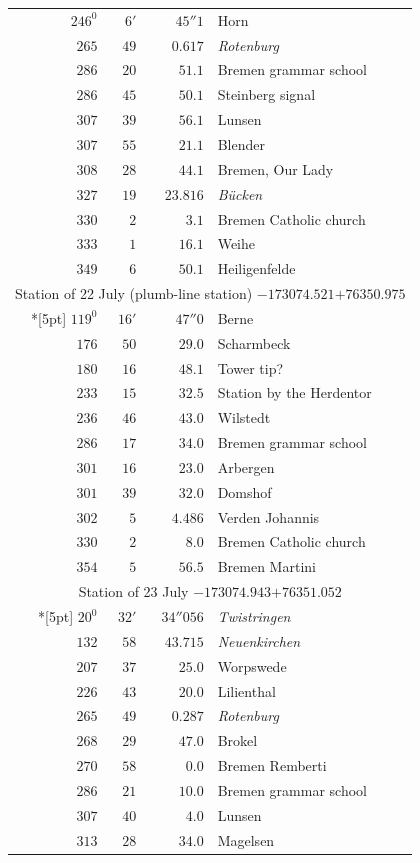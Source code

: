 \clearpage
{}%
\begingroup
\fontsize{10.5}{13}\selectfont
\setlength{\tabcolsep}{3pt}
\setlength{\LTpre}{2pt}
\setlength{\LTpost}{2pt}
\begin{longtable}{@{}rrrp{.61\linewidth}@{}}
\(246^{0}\)&\(6'\)&\(45''1\)&\raggedright Horn\tabularnewline
\(265\)&\(49\)&\(0.617\)&\raggedright \textit{Rotenburg}\tabularnewline
\(286\)&\(20\)&\(51.1\)&\raggedright Bremen grammar school\tabularnewline
\(286\)&\(45\)&\(50.1\)&\raggedright Steinberg signal\tabularnewline
\(307\)&\(39\)&\(56.1\)&\raggedright Lunsen\tabularnewline
\(307\)&\(55\)&\(21.1\)&\raggedright Blender\tabularnewline
\(308\)&\(28\)&\(44.1\)&\raggedright Bremen, Our Lady\tabularnewline
\(327\)&\(19\)&\(23.816\)&\raggedright \textit{Bücken}\tabularnewline
\(330\)&\(2\)&\(3.1\)&\raggedright Bremen Catholic church\tabularnewline
\(333\)&\(1\)&\(16.1\)&\raggedright Weihe\tabularnewline
\(349\)&\(6\)&\(50.1\)&\raggedright Heiligenfelde\tabularnewline
\multicolumn{4}{c}{Station of 22 July (plumb-line station) \(-173074.521\)\qquad\(+76350.975\)}\\*[5pt]
\(119^{0}\)&\(16'\)&\(47''0\)&\raggedright Berne\tabularnewline
\(176\)&\(50\)&\(29.0\)&\raggedright Scharmbeck\tabularnewline
\(180\)&\(16\)&\(48.1\)&\raggedright Tower tip?\tabularnewline
\(233\)&\(15\)&\(32.5\)&\raggedright Station by the Herdentor\tabularnewline
\(236\)&\(46\)&\(43.0\)&\raggedright Wilstedt\tabularnewline
\(286\)&\(17\)&\(34.0\)&\raggedright Bremen grammar school\tabularnewline
\(301\)&\(16\)&\(23.0\)&\raggedright Arbergen\tabularnewline
\(301\)&\(39\)&\(32.0\)&\raggedright Domshof\tabularnewline
\(302\)&\(5\)&\(4.486\)&\raggedright Verden Johannis\tabularnewline
\(330\)&\(2\)&\(8.0\)&\raggedright Bremen Catholic church\tabularnewline
\(354\)&\(5\)&\(56.5\)&\raggedright Bremen Martini\tabularnewline
\multicolumn{4}{c}{Station of 23 July \(-173074.943\)\qquad\(+76351.052\)}\\*[5pt]
\(20^{0}\)&\(32'\)&\(34''056\)&\raggedright \textit{Twistringen}\tabularnewline
\(132\)&\(58\)&\(43.715\)&\raggedright \textit{Neuenkirchen}\tabularnewline
\(207\)&\(37\)&\(25.0\)&\raggedright Worpswede\tabularnewline
\(226\)&\(43\)&\(20.0\)&\raggedright Lilienthal\tabularnewline
\(265\)&\(49\)&\(0.287\)&\raggedright \textit{Rotenburg}\tabularnewline
\(268\)&\(29\)&\(47.0\)&\raggedright Brokel\tabularnewline
\(270\)&\(58\)&\(0.0\)&\raggedright Bremen Remberti\tabularnewline
\(286\)&\(21\)&\(10.0\)&\raggedright Bremen grammar school\tabularnewline
\(307\)&\(40\)&\(4.0\)&\raggedright Lunsen\tabularnewline
\(313\)&\(28\)&\(34.0\)&\raggedright Magelsen\tabularnewline

\end{longtable}
